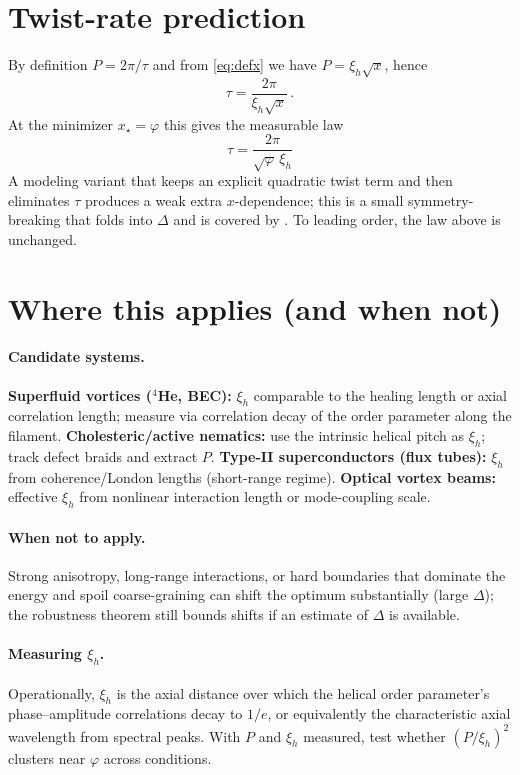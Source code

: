 \documentclass[11pt]{article}
\theoremstyle{remark}
\theoremstyle{definition}
\newcommand{\ph}{\varphi}
\begin{document}
\section{Twist-rate prediction}
By definition $P=2\pi/\tau$ and from \eqref{eq:defx} we have $P=\xi_h\sqrt{x}$, hence
\begin{equation}
 \tau=\frac{2\pi}{\xi_h\sqrt{x}}\,.
\end{equation}
At the minimizer $x_\star=\ph$ this gives the measurable law
\begin{equation}
 \boxed{\;\tau=\dfrac{2\pi}{\sqrt{\ph}\,\xi_h}\;}
\end{equation}
A modeling variant that keeps an explicit quadratic twist term and then eliminates $\tau$ produces a weak extra $x$-dependence; this is a small symmetry-breaking that folds into $\Delta$ and is covered by . To leading order, the law above is unchanged.

\section{Where this applies (and when not)}
\paragraph{Candidate systems.} \textbf{Superfluid vortices (\(^{4}\)He, BEC):} $\xi_h$ comparable to the healing length or axial correlation length; measure via correlation decay of the order parameter along the filament. \textbf{Cholesteric/active nematics:} use the intrinsic helical pitch as $\xi_h$; track defect braids and extract $P$. \textbf{Type-II superconductors (flux tubes):} $\xi_h$ from coherence/London lengths (short-range regime). \textbf{Optical vortex beams:} effective $\xi_h$ from nonlinear interaction length or mode-coupling scale.
\paragraph{When not to apply.} Strong anisotropy, long-range interactions, or hard boundaries that dominate the energy and spoil coarse-graining can shift the optimum substantially (large $\Delta$); the robustness theorem still bounds shifts if an estimate of $\Delta$ is available.
\paragraph{Measuring $\xi_h$.} Operationally, $\xi_h$ is the axial distance over which the helical order parameter's phase--amplitude correlations decay to $1/e$, or equivalently the characteristic axial wavelength from spectral peaks. With $P$ and $\xi_h$ measured, test whether $(P/\xi_h)^2$ clusters near $\ph$ across conditions.
\end{document}
